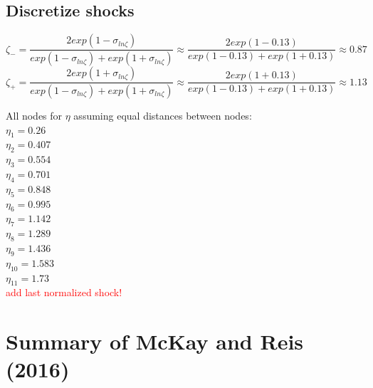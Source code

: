 \documentclass[12pt,a4paper]{article}
\begin{document}
\subsection{Discretize shocks}

\begin{equation*}
    \zeta_-=\frac{2exp(1-\sigma_{ln\zeta})}{exp(1-\sigma_{ln\zeta})+exp(1+\sigma_{ln\zeta})}\approx\frac{2exp(1-0.13)}{exp(1-0.13)+exp(1+0.13)}\approx 0.87
    \end{equation*}
    \begin{equation*}
       \zeta_+=\frac{2exp(1+\sigma_{ln\zeta})}{exp(1-\sigma_{ln\zeta})+exp(1+\sigma_{ln\zeta})}\approx\frac{2exp(1+0.13)}{exp(1-0.13)+exp(1+0.13)}\approx 1.13
    \end{equation*}

\vspace{1cm}


All nodes for $\eta$ assuming equal distances between nodes: \\
$\eta_1 = 0.26 $ \\
$\eta_2 = 0.407$ \\
$\eta_3 = 0.554$ \\
$\eta_4 = 0.701$ \\
$\eta_5 = 0.848$ \\
$\eta_6 = 0.995$ \\
$\eta_7 = 1.142$ \\
$\eta_8 = 1.289$ \\
$\eta_9 = 1.436$ \\
$\eta_{10} = 1.583$ \\
$\eta_{11} = 1.73$ \\

\textcolor{red}{add last normalized shock!}

\section{Summary of McKay and Reis (2016)}
\end{document}
